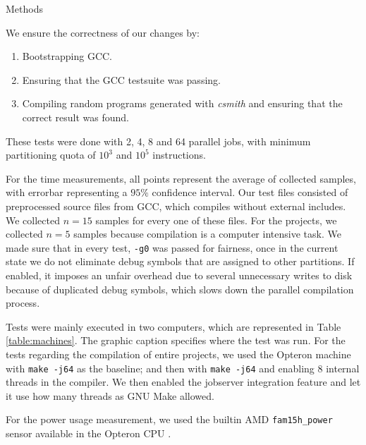 \begin{subsection}{Methods}\label{sec:methods}

We ensure the correctness of our changes by:

\begin{enumerate}
\item Bootstrapping GCC.
\item Ensuring that the GCC testsuite was passing.
\item Compiling random programs generated with \textit{csmith} \citep{csmith}
and ensuring that the correct result was found.
\end{enumerate}

These tests were done with 2, 4, 8 and 64 parallel jobs, with minimum
partitioning quota of $10^3$ and $10^5$ instructions.

For the time measurements, all points represent the average of collected
samples, with errorbar representing a $95\%$ confidence interval.  Our test
files consisted of preprocessed source files from GCC, which compiles without
external includes. We collected $n = 15$ samples for every one of these files.
For the projects, we collected $n = 5$ samples because compilation is a
computer intensive task. We made sure that in every test, \texttt{-g0} was
passed for fairness, once in the current state we do not eliminate debug
symbols that are assigned to other partitions. If enabled, it imposes an
unfair overhead due to several unnecessary writes to disk because of duplicated
debug symbols, which slows down the parallel compilation process.

Tests were mainly executed in two computers, which are represented in Table
\ref{table:machines}. The graphic caption specifies where the test was run.
For the tests regarding the compilation of entire projects, we used the Opteron
machine with \texttt{make -j64} as the baseline; and then with \texttt{make
-j64} and enabling 8 internal threads in the compiler. We then enabled the
jobserver integration feature and let it use how many threads as GNU Make
allowed.

For the power usage measurement, we used the builtin AMD \texttt{fam15h\_power}
sensor available in the Opteron CPU \citep{fam15h}.


\end{subsection}
